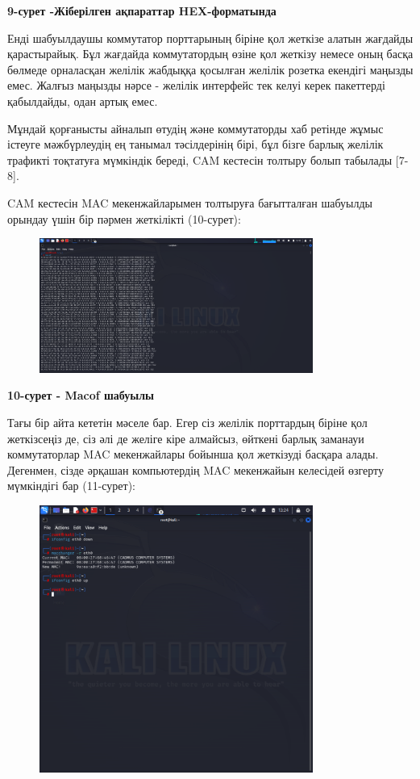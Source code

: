 \textbf{9-сурет -Жіберілген ақпараттар HEX-форматында}

Енді шабуылдаушы коммутатор порттарының біріне қол жеткізе алатын
жағдайды қарастырайық. Бұл жағдайда коммутатордың өзіне қол жеткізу
немесе оның басқа бөлмеде орналасқан желілік жабдыққа қосылған желілік
розетка екендігі маңызды емес. Жалғыз маңызды нәрсе - желілік интерфейс
тек келуі керек пакеттерді қабылдайды, одан артық емес.

Мұндай қорғанысты айналып өтудің және коммутаторды хаб ретінде жұмыс
істеуге мәжбүрлеудің ең танымал тәсілдерінің бірі, бұл бізге барлық
желілік трафикті тоқтатуға мүмкіндік береді, CAM кестесін толтыру болып
табылады {[}7-8{]}.

CAM кестесін MAC мекенжайларымен толтыруға бағытталған шабуылды орындау
үшін бір пәрмен жеткілікті (10-сурет):

\begin{figure}[H]
	\centering
	\includegraphics[width=0.8\textwidth]{assets/34}
	\caption*{}
\end{figure}

\textbf{10-сурет - Macof шабуылы}

Тағы бір айта кететін мәселе бар. Егер сіз желілік порттардың біріне қол
жеткізсеңіз де, сіз әлі де желіге кіре алмайсыз, өйткені барлық заманауи
коммутаторлар MAC мекенжайлары бойынша қол жеткізуді басқара алады.
Дегенмен, сізде әрқашан компьютердің MAC мекенжайын келесідей өзгерту
мүмкіндігі бар (11-сурет):

\begin{figure}[H]
	\centering
	\includegraphics[width=0.8\textwidth]{assets/35}
	\caption*{}
\end{figure}

